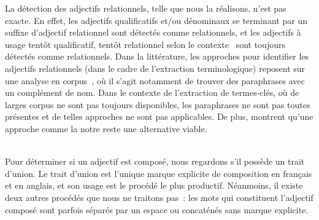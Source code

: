       La détection des adjectifs relationnels, telle que nous la réalisons,
      n'est pas exacte. En effet, les adjectifs qualificatifs et/ou
      dénominaux se terminant par un suffixe d'adjectif relationnel sont
      détectés comme relationnels, et les adjectifs à usage tentôt qualificatif,
      tentôt relationnel selon le contexte~\cite{maniez2009denominaladjectives}
      sont toujours détectés comme relationnels. Dans la littérature, les
      approches pour identifier les adjectifs relationnels (dans le cadre de
      l'extraction terminologique) reposent sur une analyse en
      corpus~\cite{daille2000relationaladjectives,maniez2005automaticrelationaladjectiveidentification,harastani2013relationaladjectivetranslation},
      où il s'agit notamment de trouver des paraphrases avec un complément de
      nom. Dans le contexte de l'extraction de termes-clés, où de larges corpus
      ne sont pas toujours disponibles, les paraphrases ne sont pas toutes
      présentes et de telles approches ne sont pas applicables. De plus,
       montrent qu'une
      approche comme la notre reste une alternative viable.

      ~\\Pour déterminer si un adjectif est composé, nous regardons s'il possède
      un trait d'union. Le trait d'union est l'unique marque explicite de
      composition en français et en anglais, et son usage est le procédé le plus
      productif. Néanmoins, il existe deux autres procédés que nous ne traitons
      pas~: les mots qui constituent l'adjectif composé sont parfois séparés
      par un espace ou concaténés sans marque explicite.

